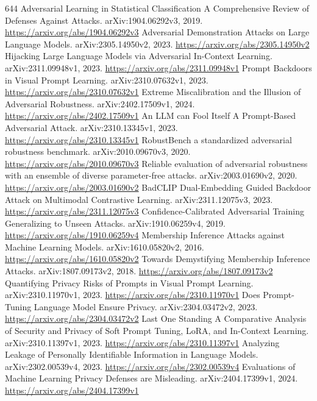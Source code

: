 \documentclass[11pt]{article}
\begin{document}
\begin{thebibliography}{644}
 Adversarial Learning in Statistical Classification A Comprehensive Review of Defenses Against Attacks. arXiv:1904.06292v3, 2019. \url{https://arxiv.org/abs/1904.06292v3}
 Adversarial Demonstration Attacks on Large Language Models. arXiv:2305.14950v2, 2023. \url{https://arxiv.org/abs/2305.14950v2}
 Hijacking Large Language Models via Adversarial In-Context Learning. arXiv:2311.09948v1, 2023. \url{https://arxiv.org/abs/2311.09948v1}
 Prompt Backdoors in Visual Prompt Learning. arXiv:2310.07632v1, 2023. \url{https://arxiv.org/abs/2310.07632v1}
 Extreme Miscalibration and the Illusion of Adversarial Robustness. arXiv:2402.17509v1, 2024. \url{https://arxiv.org/abs/2402.17509v1}
 An LLM can Fool Itself A Prompt-Based Adversarial Attack. arXiv:2310.13345v1, 2023. \url{https://arxiv.org/abs/2310.13345v1}
 RobustBench a standardized adversarial robustness benchmark. arXiv:2010.09670v3, 2020. \url{https://arxiv.org/abs/2010.09670v3}
 Reliable evaluation of adversarial robustness with an ensemble of diverse parameter-free attacks. arXiv:2003.01690v2, 2020. \url{https://arxiv.org/abs/2003.01690v2}
 BadCLIP Dual-Embedding Guided Backdoor Attack on Multimodal Contrastive Learning. arXiv:2311.12075v3, 2023. \url{https://arxiv.org/abs/2311.12075v3}
 Confidence-Calibrated Adversarial Training Generalizing to Unseen Attacks. arXiv:1910.06259v4, 2019. \url{https://arxiv.org/abs/1910.06259v4}
 Membership Inference Attacks against Machine Learning Models. arXiv:1610.05820v2, 2016. \url{https://arxiv.org/abs/1610.05820v2}
 Towards Demystifying Membership Inference Attacks. arXiv:1807.09173v2, 2018. \url{https://arxiv.org/abs/1807.09173v2}
 Quantifying Privacy Risks of Prompts in Visual Prompt Learning. arXiv:2310.11970v1, 2023. \url{https://arxiv.org/abs/2310.11970v1}
 Does Prompt-Tuning Language Model Ensure Privacy. arXiv:2304.03472v2, 2023. \url{https://arxiv.org/abs/2304.03472v2}
 Last One Standing A Comparative Analysis of Security and Privacy of Soft Prompt Tuning, LoRA, and In-Context Learning. arXiv:2310.11397v1, 2023. \url{https://arxiv.org/abs/2310.11397v1}
 Analyzing Leakage of Personally Identifiable Information in Language Models. arXiv:2302.00539v4, 2023. \url{https://arxiv.org/abs/2302.00539v4}
 Evaluations of Machine Learning Privacy Defenses are Misleading. arXiv:2404.17399v1, 2024. \url{https://arxiv.org/abs/2404.17399v1}

\end{thebibliography}
\end{document}
